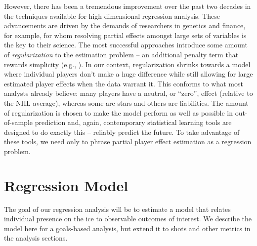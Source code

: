 However, there has been a tremendous improvement over the past two decades in
the techniques available for high dimensional regression analysis.  These
advancements are driven by the demands of researchers in genetics and finance,
for example, for whom resolving partial effects amongst  large sets of
variables is the key to their science.  The most successful approaches
introduce some amount of \textit{regularization}  to the estimation
problem -- an additional penalty term that rewards simplicity (e.g.,
\cite{hastie:tibsh:fried:2001}).  In our context, regularization shrinks
towards a model where individual players don't make a huge difference while
still allowing for large estimated player effects when the data warrant it.
This conforms to what most analysts already believe: many players have a
neutral, or ``zero'', effect (relative to the NHL average), whereas some are
stars and others are liabilities.     The amount of regularization is chosen
to make the model perform as well as possible in out-of-sample prediction and,
again, contemporary statistical learning tools are designed to do exactly
this -- reliably predict the future. To take advantage of these tools, we  need
only to phrase partial player effect estimation  as a regression problem.


 
\section{Regression Model}
\label{sec:regression}

The goal of our regression analysis will be to estimate a model that  relates
individual presence on the ice to observable outcomes of interest.  We
describe the model here for a goals-based analysis, but extend it to shots and
other metrics in the analysis sections.

